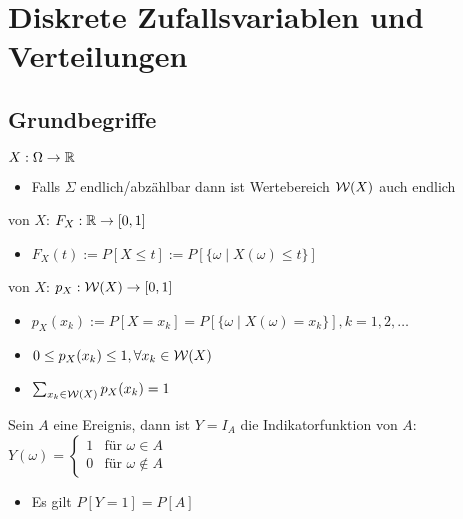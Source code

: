 
\section{Diskrete Zufallsvariablen und Verteilungen}
\subsection{Grundbegriffe}
\begin{itemize}
     $X: \Omega \to \mathbb{R}$
        \begin{itemize}
            \item Falls $\Sigma$ endlich/abzählbar dann ist Wertebereich $\mathcal{W}(X)$ auch endlich
        \end{itemize}
     von $X$: $F_X : \mathbb{R} \to [0,1]$
        \begin{itemize}
            \item $F_X(t) := P[X \le t] := P[\{\omega \mid X(\omega) \le t\}]$
        \end{itemize}
     von $X$: $p_X: \mathcal{W}(X) \to [0,1]$
        \begin{itemize}
            \item $p_X(x_k) := P[X = x_k] = P[\{\omega \mid X(\omega) = x_k\}], k = 1, 2, \dots$
            \item $0 \le p_X(x_k) \le 1, \forall x_k \in \mathcal{W}(X)$
            \item $\sum_{x_k \in \mathcal{W}(X)}p_X(x_k) = 1$
        \end{itemize}
         Sein $A$ eine Ereignis, dann ist $Y = I_A$ die Indikatorfunktion von $A$: $Y(\omega)=
\begin{cases}
    1 & \text{für } \omega \in A\\
    0 & \text{für } \omega \notin A
\end{cases}$
            \begin{itemize}
                \item Es gilt $P[Y = 1] = P[A]$
            \end{itemize}
\end{itemize}

